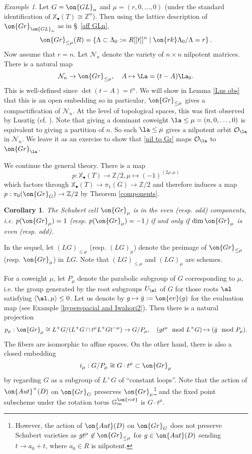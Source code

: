 \documentclass[]{pcmi}
\theoremstyle{plain}
\newtheorem{cor}[equation]{Corollary}
\theoremstyle{remark}
\newtheorem{ex}[equation]{Example}
\theoremstyle{definition}
\newcommand{\bG}{{\mathbb G}}
\newcommand{\bZ}{{\mathbb Z}}
\newcommand{\mN}{{\mathcal N}}
\newcommand{\mO}{{\mathcal O}}
\newcommand{\Aut}{{\on{Aut}}}
\newcommand{\Gr}{{\on{Gr}}}
\newcommand{\GL}{{\on{GL}}}
\def\xcoch{\mathbb{X}_\bullet}
\begin{document}
\begin{ex}\label{momega1}
Let $G=\GL_n$ and $\mu=(r,0,\ldots,0)$ (under the standard identification of $\xcoch(T)\cong \bZ^n$). Then using the lattice description of $\Gr_{\GL_n}$ as in \S\ \ref{aff GLn},
$$\Gr_{\leq \mu}(R)=\left\{ \Lambda\subset \Lambda_0:=R[[t]]^n\mid \on{rk} \Lambda_0/\Lambda=r\right\}.$$
Now assume that $r=n$.
Let $\mN_n$ denote the variety of $n\times n$ nilpotent matrices. There is a natural map
\begin{equation}\label{nil to Gr}
\mN_n\to \Gr_{\leq \mu},\quad A\mapsto \La=(t-A)\La_0.
\end{equation}
This is well-defined since $\det(t-A)=t^n$. We will show in Lemma \ref{Lus obs} that this is an open embedding so in particular, $\Gr_{\leq \mu}$ gives a compactification of $\mN_n$.
At the level of topological spaces, this was first observed by Lusztig (cf. \cite{Lu0}). 
Note that giving a dominant coweight $\la\leq \mu=(n,0,\ldots,0)$ is equivalent to giving a partition of $n$. So each $\la\leq \mu$ gives a nilpotent orbit $\mO_\la$ in $\mN_n$. We leave it as an exercise to show that \eqref{nil to Gr} maps $\mO_\la$ to $\Gr_\la$.
\end{ex}

We continue the general theory. There is a map 
\begin{equation}\label{parity map}
p:\xcoch(T)\to \bZ/2, \mu\mapsto (-1)^{(2\rho,\mu)}
\end{equation}
which factors through $\xcoch(T)\to \pi_1(G)\to \bZ/2$ and therefore induces a map $p:\pi_0(\Gr_G)\to \bZ/2$
by Theorem \ref{components}. 
\begin{cor}\label{parity}
The Schubert cell $\Gr_{\mu}$ is in the even (resp. odd) components, i.e. $p(\Gr_{\mu})=1$ (resp. $p(\Gr_{\mu})=-1$) if and only if $\dim \Gr_{\mu}$ is even (resp. odd).
\end{cor}

In the sequel, let $(LG)_{\leq \mu}$ (resp. $(LG)_\mu$) denote the preimage of $\Gr_{\leq \mu}$ (resp. $\Gr_\mu$) in $LG$. Note that $(LG)_{\leq \mu}$ and $(LG)_{\mu}$ are schemes.

For a coweight $\mu$, let $P_\mu$ denote the parabolic subgroup of $G$ corresponding to $\mu$, i.e. the group generated by the root subgroups $U_\al$ of $G$ for those roots $\al$ satisfying $\langle\al,\mu\rangle\leq 0$. Let us denote by $g\mapsto \bar{g}:=\on{ev}(g)$ for the evaluation map (see Example \ref{hyperspacial and Iwahori2}).
Then there is a natural projection
\[p_\mu: \Gr_\mu\cong L^+G/(L^+G\cap t^\mu L^+G t^{-\mu})\to G/P_\mu,\quad (gt^\mu \mod L^+G)\mapsto (\bar{g}\mod P_\mu).\]
The fibers are isomorphic to affine spaces. 
On the other hand, there is also a closed embedding
\[i_\mu: G/P_\mu\cong G\cdot t^\mu\subset \Gr_\mu\]
by regarding $G$ as a subgroup of $L^+G$ of ``constant loops''. Note that  
the action of  $\Aut^+(D)$ on $\Gr_G$ preserves $\Gr_\mu$\footnote{However, the action of $\Aut(D)$ on $\Gr_G$ does not preserve Schubert varieties as $gt^\mu\not\in \Gr_{\leq \mu}$ for $g\in \Aut(D)$ sending $t\to a_0+t$, where $a_0\in R$ is nilpotent.} and the fixed point subscheme under the rotation torus $\bG_m^{\on{rot}}$ is $G\cdot t^\mu$.
\end{document}

